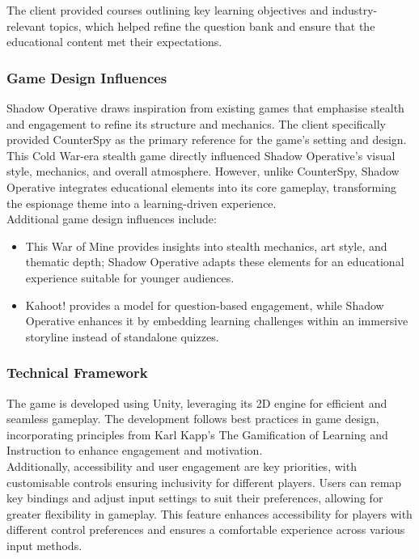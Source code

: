 \documentclass[11pt, a4paper]{article}
\begin{document}
\noindent The client provided courses outlining key learning objectives and industry-relevant topics, which helped refine the question bank and ensure that the educational content met their expectations.

\subsubsection{Game Design Influences}

\noindent Shadow Operative draws inspiration from existing games that emphasise stealth and engagement to refine its structure and mechanics. The client specifically provided CounterSpy as the primary reference for the game's setting and design. This Cold War-era stealth game directly influenced Shadow Operative’s visual style, mechanics, and overall atmosphere. However, unlike CounterSpy, Shadow Operative integrates educational elements into its core gameplay, transforming the espionage theme into a learning-driven experience. \\

\noindent Additional game design influences include:

\begin{itemize}
    \item This War of Mine provides insights into stealth mechanics, art style, and thematic depth; Shadow Operative adapts these elements for an educational experience suitable for younger audiences.
    \item Kahoot! provides a model for question-based engagement, while Shadow Operative enhances it by embedding learning challenges within an immersive storyline instead of standalone quizzes.
\end{itemize}

\subsubsection{Technical Framework}

\noindent The game is developed using Unity, leveraging its 2D engine for efficient and seamless gameplay. The development follows best practices in game design, incorporating principles from Karl Kapp’s The Gamification of Learning and Instruction to enhance engagement and motivation. \\

\noindent Additionally, accessibility and user engagement are key priorities, with customisable controls ensuring inclusivity for different players. Users can remap key bindings and adjust input settings to suit their preferences, allowing for greater flexibility in gameplay. This feature enhances accessibility for players with different control preferences and ensures a comfortable experience across various input methods. \\
\end{document}
